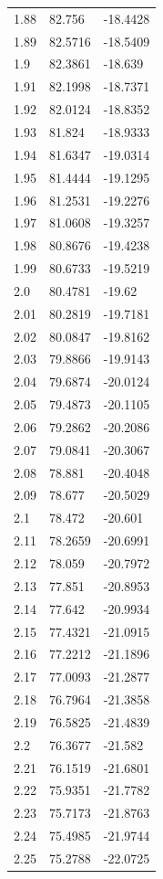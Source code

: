 \begin{table}
\begin{tabular}{lll}
1.88 & 82.756 & -18.4428 \\
1.89 & 82.5716 & -18.5409 \\
1.9 & 82.3861 & -18.639 \\
1.91 & 82.1998 & -18.7371 \\
1.92 & 82.0124 & -18.8352 \\
1.93 & 81.824 & -18.9333 \\
1.94 & 81.6347 & -19.0314 \\
1.95 & 81.4444 & -19.1295 \\
1.96 & 81.2531 & -19.2276 \\
1.97 & 81.0608 & -19.3257 \\
1.98 & 80.8676 & -19.4238 \\
1.99 & 80.6733 & -19.5219 \\
2.0 & 80.4781 & -19.62 \\
2.01 & 80.2819 & -19.7181 \\
2.02 & 80.0847 & -19.8162 \\
2.03 & 79.8866 & -19.9143 \\
2.04 & 79.6874 & -20.0124 \\
2.05 & 79.4873 & -20.1105 \\
2.06 & 79.2862 & -20.2086 \\
2.07 & 79.0841 & -20.3067 \\
2.08 & 78.881 & -20.4048 \\
2.09 & 78.677 & -20.5029 \\
2.1 & 78.472 & -20.601 \\
2.11 & 78.2659 & -20.6991 \\
2.12 & 78.059 & -20.7972 \\
2.13 & 77.851 & -20.8953 \\
2.14 & 77.642 & -20.9934 \\
2.15 & 77.4321 & -21.0915 \\
2.16 & 77.2212 & -21.1896 \\
2.17 & 77.0093 & -21.2877 \\
2.18 & 76.7964 & -21.3858 \\
2.19 & 76.5825 & -21.4839 \\
2.2 & 76.3677 & -21.582 \\
2.21 & 76.1519 & -21.6801 \\
2.22 & 75.9351 & -21.7782 \\
2.23 & 75.7173 & -21.8763 \\
2.24 & 75.4985 & -21.9744 \\
2.25 & 75.2788 & -22.0725 \\

\end{tabular}
\end{table}

